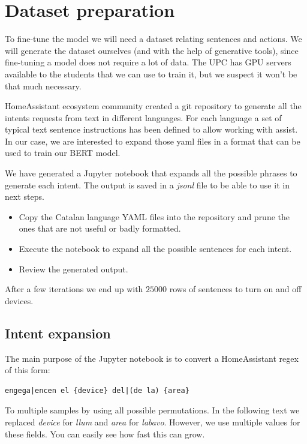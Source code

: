 \documentclass{article}
\begin{document}
\section{Dataset preparation}

To fine-tune the model we will need a dataset relating sentences and actions. We will generate the dataset ourselves (and with the help of generative tools), since fine-tuning a model does not require a lot of data. The UPC has GPU servers available to the students that we can use to train it, but we suspect it won't be that much necessary.

HomeAssistant ecosystem community created a git repository \cite{homeassistant_intents} to generate all the intents requests from text in different languages.
For each language a set of typical text sentence instructions has been defined to allow working with assist.
In our case, we are interested to expand those yaml files in a format that can be used to train our BERT model. 

We have generated a Jupyter notebook that expands all the possible phrases to generate each intent. The output is saved in a \textit{jsonl} file to be able to use it in next steps.

\begin{itemize}
    \item Copy the Catalan language YAML files into the repository and prune the ones that are not useful or badly formatted.
    \item Execute the notebook to expand all the possible sentences for each intent.
    \item Review the generated output.
\end{itemize}

After a few iterations we end up with $25000$ rows of sentences to turn on and off devices.

\subsection{Intent expansion}

The main purpose of the Jupyter notebook is to convert a HomeAssistant regex of this
form:

\begin{verbatim}
engega|encen el {device} del|(de la) {area}
\end{verbatim}

To multiple samples by using all possible permutations. In the following text
we replaced \textit{device} for \textit{llum} and \textit{area} for \textit{labavo}. However, we use multiple values for these fields. You can easily see how fast this can grow.
\end{document}
